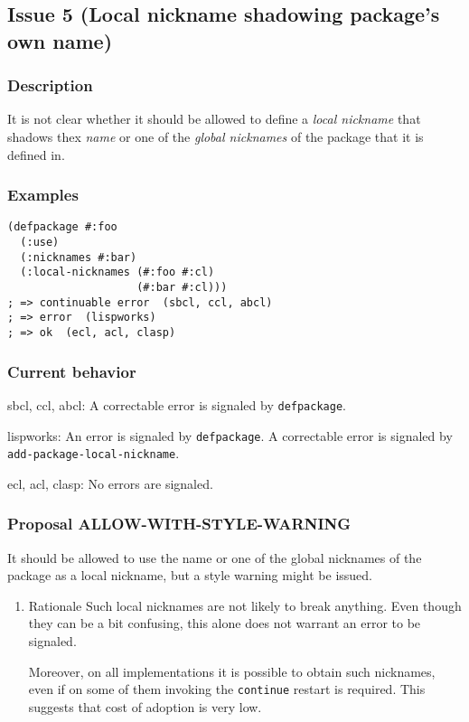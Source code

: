 \documentclass[11pt]{article}
\begin{document}
\subsection{Issue 5 (Local nickname shadowing package's own name)}
\label{sec:org706f975}
\subsubsection{Description}
\label{sec:orgc4be3d7}
It is not clear whether it should be allowed to define a \emph{local nickname} that
shadows thex \emph{name} or one of the \emph{global nicknames} of the package that it is
defined in.
\subsubsection{Examples}
\label{sec:org2215038}
\begin{verbatim}
(defpackage #:foo
  (:use)
  (:nicknames #:bar)
  (:local-nicknames (#:foo #:cl)
                    (#:bar #:cl)))
; => continuable error  (sbcl, ccl, abcl)
; => error  (lispworks)
; => ok  (ecl, acl, clasp)
\end{verbatim}
\subsubsection{Current behavior}
\label{sec:orgd270533}
sbcl, ccl, abcl:
  A correctable error is signaled by \texttt{defpackage}.

lispworks:
  An error is signaled by \texttt{defpackage}.
  A correctable error is signaled by \texttt{add-package-local-nickname}.

ecl, acl, clasp:
  No errors are signaled.
\subsubsection{Proposal ALLOW-WITH-STYLE-WARNING}
\label{sec:org75cfb25}
It should be allowed to use the name or one of the global nicknames of the package
as a local nickname, but a style warning might be issued.
\begin{enumerate}
\item Rationale
\label{sec:orgd93baaf}
Such local nicknames are not likely to break anything. Even though they can be a
bit confusing, this alone does not warrant an error to be signaled.

Moreover, on all implementations it is possible to obtain such nicknames, even if
on some of them invoking the \texttt{continue} restart is required. This suggests that
cost of adoption is very low.
\end{enumerate}
\end{document}
